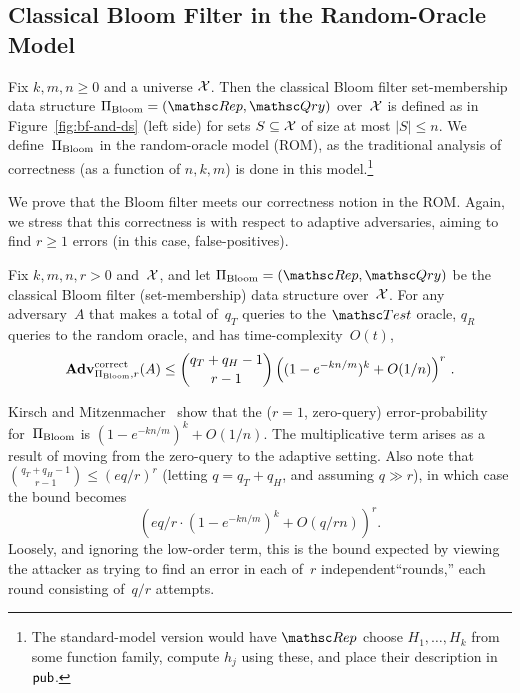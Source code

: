 \subsection{Classical Bloom Filter in the Random-Oracle Model}
Fix $k,m,n \geq 0$ and a universe ${\cal X}$.  Then the classical Bloom
filter set-membership data structure $\setprim_{\mathrm{Bloom}}=
(\Rep, \Qry)$ over~${\cal X}$ is defined as in
Figure~\ref{fig:bf-and-ds} (left side) for sets $S \subseteq {\cal X}$
of size at most $|S|\leq n$. We define~$\Pi_{\mathrm{Bloom}}$
in the random-oracle model (ROM), as the traditional analysis of
correctness (as a function of $n,k,m$) is done in this
model.\footnote{The standard-model version would have $\Rep$ choose
$H_1,\ldots,H_k$ from some function family, compute $h_j$ using
these, and place their description in ${\sf pub}$.}

 We prove that the Bloom filter meets our
correctness notion in the ROM.  Again, we stress that this
correctness is with respect to adaptive adversaries, aiming to find
$r \geq 1$ errors (in this case, false-positives).


\begin{theorem}\label{thm3}\label{thm:bf-correctness}
Fix $k,m,n,r>0$ and~${\cal X}$, and let $\setprim_{\mathrm{Bloom}}=
(\Rep, \Qry)$ be the classical Bloom filter (set-membership) data
structure over~${\cal X}$. For any adversary~$A$ that makes a total
of~$q_T$ queries to the $\Test$ oracle, $q_R$ queries to the random
oracle, and has time-complexity~$O(t)$,
\[
\mathrm{\mathbf{Adv}}^{\mathrm{correct}}_{\Pi_{\mathrm{Bloom}},r}(A) \leq  {\dbinom{q_T + q_H-1}{r-1}} \left( (1-e^{-kn/m})^k + O(1/n) \right)^r\,.
\]
\end{theorem}
Kirsch and Mitzenmacher~\cite{kirsch2006less} show that the ($r=1$,
zero-query) error-probability
for~$\Pi_\mathrm{Bloom}$ is %
$(1-e^{-kn/m})^k+O(1/n)$. %
The multiplicative %
term arises as a result of moving from the zero-query to the
adaptive setting. Also note that $\binom{q_T+q_H-1}{r-1} \leq
(eq/r)^r$ (letting $q=q_T+q_H$, and assuming $q\gg r$), in which
case the bound becomes
\[\left(eq/r \cdot (1-e^{-kn/m})^k + O(q/rn) \right)^r.\]
Loosely, and ignoring the low-order term, this is the bound expected
by viewing the attacker as trying to find an error in each of~$r$
independent``rounds,'' each round consisting of~$q/r$ attempts.


